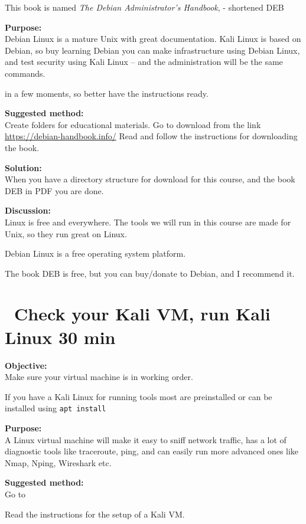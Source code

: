 \documentclass[a4paper,11pt,notitlepage]{report}
\begin{document}
This book is named
\emph{The Debian Administrator’s Handbook},  - shortened DEB

{\bf Purpose:}\\
Debian Linux is a mature Unix with great documentation. Kali Linux is based on Debian, so buy learning Debian you can make infrastructure using Debian Linux, and test security using Kali Linux -- and the administration will be the same commands.

in a few moments, so better have the instructions ready.

{\bf Suggested method:}\\
Create folders for educational materials. Go to download from the link \url{https://debian-handbook.info/}
Read and follow the instructions for downloading the book.

{\bf Solution:}\\
When you have a directory structure for download for this course, and the book DEB in PDF you are done.

{\bf Discussion:}\\
Linux is free and everywhere. The tools we will run in this course are made for Unix, so they run great on Linux.

Debian Linux is a free operating system platform.

The book DEB is free, but you can buy/donate to Debian, and I recommend it.


\chapter{\faExclamationTriangle\ Check your Kali VM, run Kali Linux 30 min}
\label{ex:basicKaliVM}


{\bf Objective:}\\
Make sure your virtual machine is in working order.

If you have a Kali Linux for running tools most are preinstalled or can be installed using \verb+apt install+

{\bf Purpose:}\\
A Linux virtual machine will make it easy to sniff network traffic, has a lot of diagnostic tools like traceroute, ping, and can easily run more advanced ones like Nmap, Nping, Wireshark etc.

{\bf Suggested method:}\\
Go to 

Read the instructions for the setup of a Kali VM.
\end{document}
